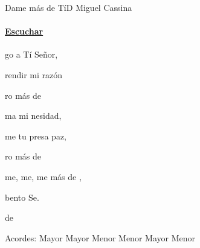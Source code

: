 \documentclass[12pt, spanish]{book}
\begin{document}
    \begin{song}{Dame más de Tí}{D}
        {} %
        {Miguel Cassina}
        {} %
        {}
        \ifChordBk
        \paragraph{\mbox{}\hfill\protect\href{https://open.spotify.com/intl-es/track/0imd5ozg3GpCp8V4Emxdtt}{Escuchar}\mbox{}\hfill}
        \fi

        \begin{SBOpGroup}
            go a Tí  Señor,

             rendir mi razón

            ro más de 
        \end{SBOpGroup}
        \vskip 20pt
        \begin{SBOpGroup}
            ma mi nesidad,

            me tu presa paz,

            ro más de 
        \end{SBOpGroup}

        \begin{SBChorus}
            me, me, me más de ,

            bento Se.

              de 
        \end{SBChorus}

        \ifChordBk
        \begin{SBOpGroup}
            Acordes:\break
             Mayor \hfill
             Mayor \hfill\null\break
             Menor \hfill
             Menor \hfill\null\break
             Mayor \hfill
             Menor \hfill\null\break
        \end{SBOpGroup}
        \fi
    \end{song}
\end{document}
